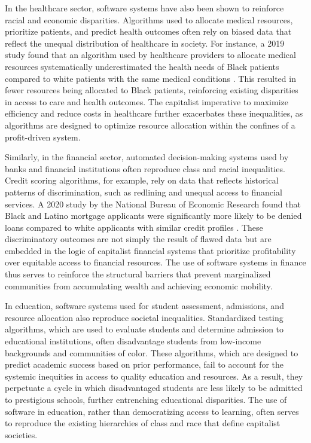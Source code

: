 \begin{refsection}
In the healthcare sector, software systems have also been shown to reinforce racial and economic disparities. Algorithms used to allocate medical resources, prioritize patients, and predict health outcomes often rely on biased data that reflect the unequal distribution of healthcare in society. For instance, a 2019 study found that an algorithm used by healthcare providers to allocate medical resources systematically underestimated the health needs of Black patients compared to white patients with the same medical conditions \cite[pp.~447-448]{obermeyer2019}. This resulted in fewer resources being allocated to Black patients, reinforcing existing disparities in access to care and health outcomes. The capitalist imperative to maximize efficiency and reduce costs in healthcare further exacerbates these inequalities, as algorithms are designed to optimize resource allocation within the confines of a profit-driven system.

Similarly, in the financial sector, automated decision-making systems used by banks and financial institutions often reproduce class and racial inequalities. Credit scoring algorithms, for example, rely on data that reflects historical patterns of discrimination, such as redlining and unequal access to financial services. A 2020 study by the National Bureau of Economic Research found that Black and Latino mortgage applicants were significantly more likely to be denied loans compared to white applicants with similar credit profiles \cite[pp.~9-11]{bartlett2020}. These discriminatory outcomes are not simply the result of flawed data but are embedded in the logic of capitalist financial systems that prioritize profitability over equitable access to financial resources. The use of software systems in finance thus serves to reinforce the structural barriers that prevent marginalized communities from accumulating wealth and achieving economic mobility.

In education, software systems used for student assessment, admissions, and resource allocation also reproduce societal inequalities. Standardized testing algorithms, which are used to evaluate students and determine admission to educational institutions, often disadvantage students from low-income backgrounds and communities of color. These algorithms, which are designed to predict academic success based on prior performance, fail to account for the systemic inequities in access to quality education and resources. As a result, they perpetuate a cycle in which disadvantaged students are less likely to be admitted to prestigious schools, further entrenching educational disparities. The use of software in education, rather than democratizing access to learning, often serves to reproduce the existing hierarchies of class and race that define capitalist societies.


\end{refsection}
